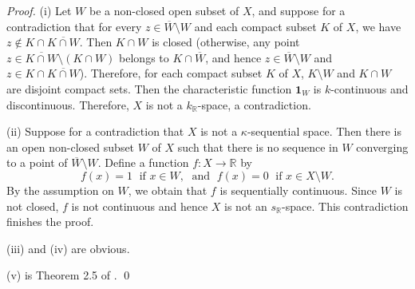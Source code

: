 \documentclass[preprint,11pt]{elsarticle}
\numberwithin{equation}{section}
\numberwithin{theorem}{section}
\newcommand{\w}{\omega}
\newcommand{\IR}{\mathbb{R}}
\newcommand{\SM}{{\setminus}}
\begin{document}
\begin{proof}
(i) Let $W$ be a non-closed open subset of $X$, and suppose for a contradiction that for every $z\in \overline{W}\SM W$ and each compact subset $K$ of $X$, we have $z\not\in K\cap \overline{K\cap W}$. Then $K\cap W$ is closed (otherwise, any point $z\in \overline{K\cap W}\SM (K\cap W)$ belongs to $K\cap \overline{W}$, and hence $z\in \overline{W}\SM W$ and $z\in K\cap \overline{K\cap W}$). Therefore, for each compact subset $K$ of $X$, $K\SM W$ and $K\cap W$ are disjoint compact sets. Then the characteristic function $\mathbf{1}_W$ is $k$-continuous and discontinuous. Therefore, $X$ is not a $k_\IR$-space, a contradiction.



(ii) Suppose for a contradiction that $X$ is not a $\kappa$-sequential space. Then there is an open non-closed subset $W$ of $X$ such that there is no sequence in $W$ converging to a point of $\overline{W}\SM W$. Define a function $f:X\to \IR$ by
\[
f(x)=1 \;\mbox{ if } x\in W, \; \mbox{ and } \; f(x)=0 \;\mbox{ if } x\in X\SM W.
\]
By the assumption on $W$, we obtain that $f$  is sequentially continuous. Since $W$ is not closed, $f$ is not continuous and hence $X$ is not an  $s_\IR$-space. This contradiction finishes the proof.

(iii) and (iv) are  obvious. %

(v) is Theorem 2.5 of \cite{Gabr-B1}.
\qed
\end{proof}


\end{document}
